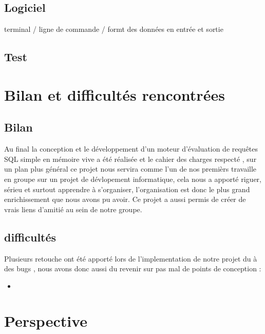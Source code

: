 \documentclass[oneside,13pt,a4paper]{report}
\begin{document}
\section{Logiciel}

terminal / ligne de commande / formt des données en entrée et sortie

\section{Test}



\chapter{Bilan et difficultés rencontrées}
\section{Bilan}

Au final la conception et le développement d'un moteur d'évaluation de requêtes SQL simple en mémoire vive a été réalisée et le cahier des charges respecté , sur un plan plus général ce projet nous servira comme l'un de nos premièrs travaille en groupe sur un projet de dévlopement informatique, cela nous a apporté riguer, sérieu et surtout apprendre à s'organiser, l'organisation est donc le plus grand enrichissement que nous avons pu avoir.
 \newline Ce projet a aussi permis de créer de vrais liens d'amitié au sein de notre groupe.

\section{difficultés}

Plusieurs retouche ont été apporté lors de l'implementation de notre projet du à des bugs , nous avons donc aussi du revenir sur pas mal de points de conception :
\begin{itemize}
  \item 
\end{itemize}

\chapter{Perspective}
\end{document}
